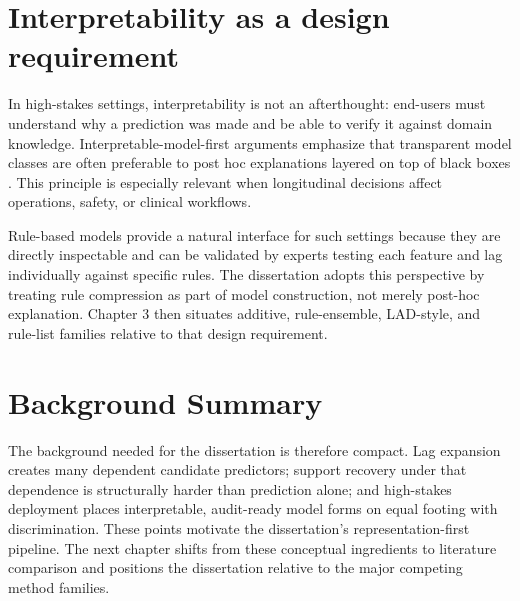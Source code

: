 \section{Interpretability as a design requirement}
In high-stakes settings, interpretability is not an afterthought: end-users must understand why a prediction was made and be able to verify it against domain knowledge. Interpretable-model-first arguments emphasize that transparent model classes are often preferable to post hoc explanations layered on top of black boxes \autocites{CRudin2019Stop,WJMurdoch2019Definitions}. This principle is especially relevant when longitudinal decisions affect operations, safety, or clinical workflows.

Rule-based models provide a natural interface for such settings because they are directly inspectable and can be validated by experts testing each feature and lag individually against specific rules. The dissertation adopts this perspective by treating rule compression as part of model construction, not merely post-hoc explanation. Chapter 3 then situates additive, rule-ensemble, LAD-style, and rule-list families relative to that design requirement.

\section{Background Summary}

The background needed for the dissertation is therefore compact. Lag expansion creates many dependent candidate predictors; support recovery under that dependence is structurally harder than prediction alone; and high-stakes deployment places interpretable, audit-ready model forms on equal footing with discrimination. These points motivate the dissertation's representation-first pipeline. The next chapter shifts from these conceptual ingredients to literature comparison and positions the dissertation relative to the major competing method families.
